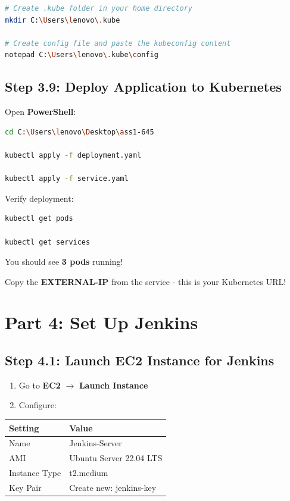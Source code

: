 \documentclass[12pt,a4paper]{article}
\begin{document}
\begin{lstlisting}[language=bash]
# Create .kube folder in your home directory
mkdir C:\Users\lenovo\.kube

# Create config file and paste the kubeconfig content
notepad C:\Users\lenovo\.kube\config
\end{lstlisting}

\subsection{Step 3.9: Deploy Application to Kubernetes}

Open \textbf{PowerShell}:

\begin{lstlisting}[language=bash]
cd C:\Users\lenovo\Desktop\ass1-645

kubectl apply -f deployment.yaml

kubectl apply -f service.yaml
\end{lstlisting}

Verify deployment:

\begin{lstlisting}[language=bash]
kubectl get pods

kubectl get services
\end{lstlisting}

You should see \textbf{3 pods} running!

Copy the \textbf{EXTERNAL-IP} from the service - this is your Kubernetes URL!

\newpage

\section{Part 4: Set Up Jenkins}

\subsection{Step 4.1: Launch EC2 Instance for Jenkins}

\begin{enumerate}
    \item Go to \textbf{EC2} $\rightarrow$ \textbf{Launch Instance}
    \item Configure:
\end{enumerate}

\begin{center}
\begin{tabular}{|l|l|}
\hline
\textbf{Setting} & \textbf{Value} \\
\hline
Name & Jenkins-Server \\
AMI & Ubuntu Server 22.04 LTS \\
Instance Type & t2.medium \\
Key Pair & Create new: jenkins-key \\
\hline
\end{tabular}
\end{center}
\end{document}
